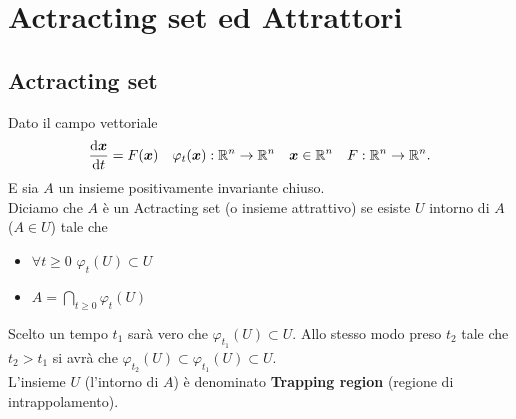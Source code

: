 \section{Actracting set ed Attrattori}%
\subsection{Actracting set}%
\begin{defn}
    Dato il campo vettoriale
    \[
	\frac{\text{d} \boldsymbol{x}}{\text{d} t} = F(\boldsymbol{x}) \quad  \varphi_t(\boldsymbol{x}):\mathbb{R}^n\to \mathbb{R}^n \quad\boldsymbol{x}\in \mathbb{R}^n \quad  F:\mathbb{R}^n\to \mathbb{R}^n
    .\] 
    E sia $A$ un insieme positivamente invariante chiuso. \\
    Diciamo che $A$ è un Actracting set (o insieme attrattivo) se esiste $U$ intorno di $A$ ($A\in U$) tale che 
    \begin{itemize}
	\item $\forall t \ge 0$ $\varphi_t(U) \subset U$ 
	\item $A = \bigcap\limits_{t\ge 0}\varphi_t(U)$
    \end{itemize}
\end{defn}
\noindent
Scelto un tempo $t_1$ sarà vero che $\varphi_{t_1}(U) \subset U$. Allo stesso modo preso $t_2$ tale che $t_2>t_1$  si avrà che $\varphi_{t_2}(U) \subset \varphi_{t_1}(U) \subset U$.\\
L'insieme $U$ (l'intorno di $A$) è denominato \textbf{Trapping region} (regione di intrappolamento). 
